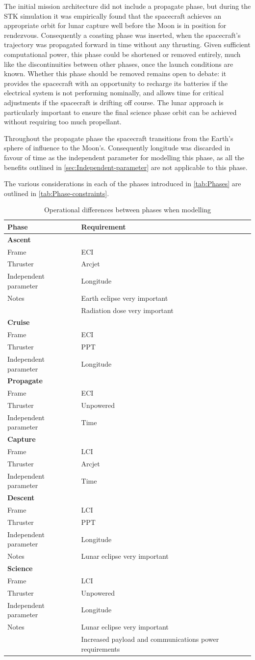 The initial mission architecture did not include a propagate phase, but during the STK simulation it was empirically found that the spacecraft achieves an appropriate orbit for lunar capture well before the Moon is in position for rendezvous. Consequently a coasting phase was inserted, when the spacecraft's trajectory was propagated forward in time without any thrusting. Given sufficient computational power, this phase could be shortened or removed entirely, much like the discontinuities between other phases, once the launch conditions are known. Whether this phase should be removed remains open to debate: it provides the spacecraft with an opportunity to recharge its batteries if the electrical system is not performing nominally, and allows time for critical adjustments if the spacecraft is drifting off course. The lunar approach is particularly important to ensure the final science phase orbit can be achieved without requiring too much propellant.

Throughout the propagate phase the spacecraft transitions from the Earth's sphere of influence to the Moon's. Consequently longitude was discarded in favour of time as the independent parameter for modelling this phase, as all the benefits outlined in \autoref{sec:Independent-parameter} are not applicable to this phase.

The various considerations in each of the phases introduced in \autoref{tab:Phases} are outlined in \autoref{tab:Phase-constraints}.

\begin{table}
\caption{Operational differences between phases when modelling \BW} \label{tab:Phase-constraints}
\begin{tabular}{l p{}} \toprule
Phase & Requirement \tabularnewline
\midrule\textbf{Ascent} \tabularnewline
Frame & ECI \tabularnewline
Thruster & Arcjet \tabularnewline
Independent parameter & Longitude \tabularnewline
Notes & Earth eclipse very important \tabularnewline
& Radiation dose very important \tabularnewline
\midrule\textbf{Cruise} \tabularnewline
Frame & ECI \tabularnewline
Thruster & PPT \tabularnewline
Independent parameter & Longitude \tabularnewline
\midrule\textbf{Propagate} \tabularnewline
Frame & ECI \tabularnewline
Thruster & Unpowered \tabularnewline
Independent parameter & Time \tabularnewline
\midrule\textbf{Capture} \tabularnewline
Frame & LCI \tabularnewline
Thruster & Arcjet \tabularnewline
Independent parameter & Time \tabularnewline
\midrule\textbf{Descent} \tabularnewline
Frame & LCI \tabularnewline
Thruster & PPT \tabularnewline
Independent parameter & Longitude \tabularnewline
Notes & Lunar eclipse very important \tabularnewline
\midrule\textbf{Science} \tabularnewline
Frame & LCI \tabularnewline
Thruster & Unpowered \tabularnewline
Independent parameter & Longitude \tabularnewline
Notes & Lunar eclipse very important \tabularnewline
& Increased payload and communications power requirements \tabularnewline
\bottomrule
\end{tabular}
\end{table}

